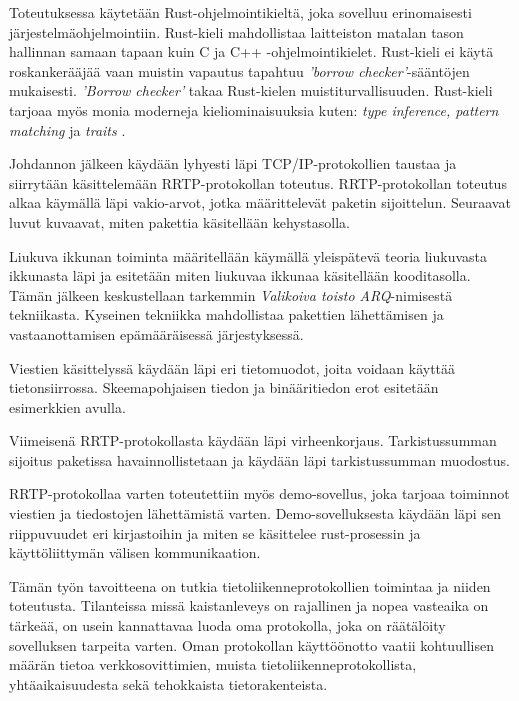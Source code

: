\documentclass[a4paper,12pt]{article}
\begin{document}
Toteutuksessa käytetään Rust-ohjelmointikieltä, joka sovelluu erinomaisesti järjestelmäohjelmointiin. Rust-kieli mahdollistaa laitteiston matalan tason hallinnan
    samaan tapaan kuin C ja C++ -ohjelmointikielet. Rust-kieli ei käytä roskankerääjää vaan muistin vapautus tapahtuu \textit{'borrow checker'}-sääntöjen mukaisesti.
    \textit{'Borrow checker'} takaa Rust-kielen muistiturvallisuuden. 
    Rust-kieli tarjoaa myös monia moderneja kieliominaisuuksia kuten: \textit{type
    inference, pattern matching} ja \textit{traits} \cite{rust-book}.

    Johdannon jälkeen käydään lyhyesti läpi TCP/IP-protokollien taustaa ja
    siirrytään käsittelemään RRTP-protokollan toteutus.
    RRTP-protokollan toteutus alkaa käymällä läpi vakio-arvot, jotka määrittelevät paketin sijoittelun. Seuraavat luvut kuvaavat, miten pakettia käsitellään kehystasolla. \par

    Liukuva ikkunan toiminta määritellään käymällä yleispätevä teoria liukuvasta ikkunasta läpi ja esitetään miten liukuvaa ikkunaa käsitellään kooditasolla. Tämän jälkeen keskustellaan tarkemmin \textit{Valikoiva toisto ARQ}-nimisestä tekniikasta.
    Kyseinen tekniikka mahdollistaa pakettien lähettämisen ja vastaanottamisen epämääräisessä järjestyksessä. \par

    Viestien käsittelyssä käydään läpi eri tietomuodot, joita voidaan käyttää tietonsiirrossa. Skeemapohjaisen tiedon ja binääritiedon erot esitetään esimerkkien avulla.\par

    Viimeisenä RRTP-protokollasta käydään läpi virheenkorjaus. 
    Tarkistussumman sijoitus paketissa havainnollistetaan ja käydään läpi
    tarkistussumman muodostus.\par

    RRTP-protokollaa varten toteutettiin myös demo-sovellus, joka tarjoaa 
    toiminnot viestien ja tiedostojen lähettämistä varten. Demo-sovelluksesta käydään 
    läpi sen riippuvuudet eri kirjastoihin ja miten se käsittelee rust-prosessin ja 
    käyttöliittymän välisen kommunikaation. \par

    Tämän työn tavoitteena on tutkia tietoliikenneprotokollien toimintaa ja niiden toteutusta. Tilanteissa missä kaistanleveys on rajallinen ja nopea vasteaika on tärkeää, on usein kannattavaa luoda oma protokolla, joka on räätälöity sovelluksen tarpeita varten.
    Oman protokollan käyttöönotto vaatii kohtuullisen määrän tietoa verkkosovittimien, muista tietoliikenneprotokollista, yhtäaikaisuudesta sekä tehokkaista tietorakenteista.\par
\end{document}
